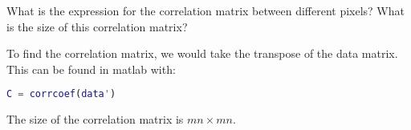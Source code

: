 What is the expression for the correlation matrix between different pixels? What is the size of this correlation matrix?

\begin{solution}
    To find the correlation matrix, we would take the transpose of the data matrix. This can be found in matlab with: \
    
    \begin{lstlisting}[language=Matlab]
C = corrcoef(data')
    \end{lstlisting}
    
    The size of the correlation matrix is $mn \times mn$.
\end{solution}